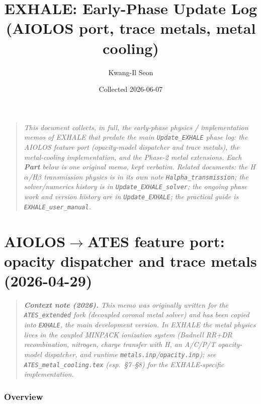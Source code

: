 \documentclass[english,a4paper]{my_memo}
\begin{document}
\title{EXHALE: Early-Phase Update Log\\(AIOLOS port, trace metals, metal cooling)}
\author{Kwang-Il Seon}
\date{Collected 2026-06-07}
\maketitle

\begin{quote}\small\itshape
This document collects, in full, the early-phase \emph{physics / implementation}
memos of EXHALE that predate the main \texttt{Update\_EXHALE} phase log: the
AIOLOS feature port (opacity-model dispatcher and trace metals), the metal-cooling
implementation, and the Phase-2 metal extensions. Each \textbf{Part} below is one
original memo, kept verbatim. Related documents: the H$\alpha$/H$\beta$
transmission physics is in its own note \texttt{Halpha\_transmission}; the
solver/numerics history is in \texttt{Update\_EXHALE\_solver}; the ongoing phase work
and version history are in \texttt{Update\_EXHALE}; the practical guide is
\texttt{EXHALE\_user\_manual}.
\end{quote}

\tableofcontents
\bigskip



\part{AIOLOS$\to$ATES feature port: opacity dispatcher and trace metals (2026-04-29)}

\begin{quote}\small\itshape
\textbf{Context note (2026).} This memo was originally written for the
\texttt{ATES\_extended} fork (decoupled coronal metal solver) and has
been copied into \texttt{EXHALE}, the main development version. In
EXHALE the metal physics lives in the coupled MINPACK ionization
system (Badnell RR+DR recombination, nitrogen, charge transfer with H,
an A/C/P/T opacity-model dispatcher, and runtime
\texttt{metals.inp}/\texttt{opacity.inp}); see
\texttt{ATES\_metal\_cooling.tex} (esp.\ \S7--\S8) for the
EXHALE-specific implementation.
\end{quote}


\section{Overview}
\end{document}
